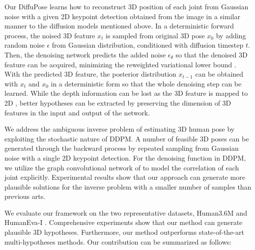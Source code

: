 \documentclass[letterpaper, 10 pt, conference]{ieeeconf}
\begin{document}
Our DiffuPose learns how to reconstruct 3D position of each joint from Gaussian noise with a given 2D keypoint detection obtained from the image in a similar manner to the diffusion models mentioned above.
In a deterministic forward process, the noised 3D feature $x_t$ is sampled from original 3D pose $x_0$ by adding random noise $\epsilon$ from Gaussian distribution, conditioned with diffusion timestep $t$.
Then, the denoising network predicts the added noise $\epsilon_\theta$ so that the denoised 3D feature can be acquired, minimizing the reweighted variational lower bound \cite{ho2020denoising}.
With the predicted 3D feature, the posterior distribution $x_{t-1}$ can be obtained with $x_t$ and $x_0$ in a deterministic form so that the whole denoising step can be learned.
While the depth information can be lost as the 3D feature is mapped to 2D \cite{wehrbein2021probabilistic}, better hypotheses can be extracted by preserving the dimension of 3D features in the input and output of the network.

We address the ambiguous inverse problem of estimating 3D human pose by exploiting the stochastic nature of DDPM.
A number of feasible 3D poses can be generated through the backward process by repeated sampling from Gaussian noise with a single 2D keypoint detection.
For the denoising function in DDPM, we utilize the graph convolutional network of \cite{zou2021modulated} to model the correlation of each joint explicitly.
Experimental results show that our approach can generate more plausible solutions for the inverse problem with a smaller number of samples than previous arts.

We evaluate our framework on the two representative datasets, Human3.6M \cite{ionescu2013human3} and HumanEva-I \cite{sigal2010humaneva}.
Comprehensive experiments show that our method can generate plausible 3D hypotheses.
Furthermore, our method outperforms state-of-the-art multi-hypotheses methods.
Our contribution can be summarized as follows:
\end{document}
